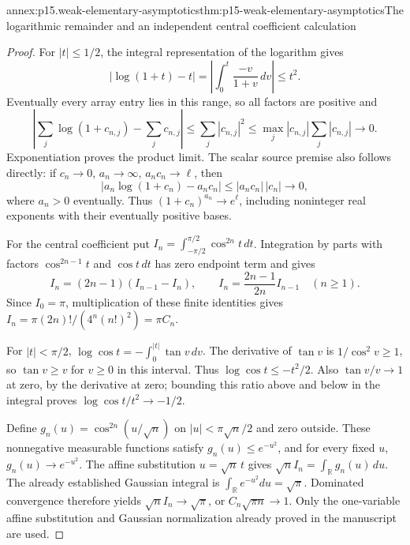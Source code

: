 \begin{annexitem}{annex:p15.weak-elementary-asymptotics}{thm:p15-weak-elementary-asymptotics}{The logarithmic remainder and an independent central coefficient calculation}
\begin{proof}
For \(|t|\leq1/2\), the integral representation of the
logarithm gives
\[
 |\log(1+t)-t|
 =\left|\int_0^t\frac{-v}{1+v}\,dv\right|
 \leq t^2.
\]
Eventually every array entry lies in this range, so all
factors are positive and
\[
 \left|\sum_j\log(1+c_{n,j})-\sum_jc_{n,j}\right|
 \leq\sum_j|c_{n,j}|^2
 \leq\max_j|c_{n,j}|\sum_j|c_{n,j}|\longrightarrow0.
\]
Exponentiation proves the product limit.
The scalar source premise also follows directly: if
\(c_n\to0\), \(a_n\to\infty\), \(a_nc_n\to\ell\), then
\[
 |a_n\log(1+c_n)-a_nc_n|\leq |a_nc_n|\,|c_n|\to0,
\]
where \(a_n>0\) eventually. Thus \((1+c_n)^{a_n}\to e^\ell\),
including noninteger real exponents with their eventually
positive bases.

For the central coefficient put
\(I_n=\int_{-\pi/2}^{\pi/2}\cos^{2n}t\,dt\).
Integration by parts with factors
\(\cos^{2n-1}t\) and \(\cos t\,dt\) has zero endpoint term
and gives
\[
 I_n=(2n-1)(I_{n-1}-I_n),\qquad
 I_n=\frac{2n-1}{2n}I_{n-1}\quad(n\geq1).
\]
Since \(I_0=\pi\), multiplication of these finite identities
gives \(I_n=\pi(2n)!/(4^n(n!)^2)=\pi C_n\).

For \(|t|<\pi/2\),
\(\log\cos t=-\int_0^{|t|}\tan v\,dv\).
The derivative of \(\tan v\) is \(1/\cos^2v\geq1\), so
\(\tan v\geq v\) for \(v\geq0\) in this interval.
Thus \(\log\cos t\leq-t^2/2\).
Also \(\tan v/v\to1\) at zero, by the derivative at zero;
bounding this ratio above and below in the integral proves
\(\log\cos t/t^2\to-1/2\).

Define \(g_n(u)=\cos^{2n}(u/\sqrt n)\) on
\(|u|<\pi\sqrt n/2\) and zero outside.
These nonnegative measurable functions satisfy
\(g_n(u)\leq e^{-u^2}\), and for every fixed \(u\),
\(g_n(u)\to e^{-u^2}\).
The affine substitution \(u=\sqrt n\,t\) gives
\(\sqrt n I_n=\int_{\mathbb R}g_n(u)\,du\).
The already established Gaussian integral is
\(\int_{\mathbb R}e^{-u^2}du=\sqrt\pi\).
Dominated convergence therefore yields
\(\sqrt n I_n\to\sqrt\pi\), or
\(C_n\sqrt{\pi n}\to1\).
Only the one-variable affine substitution and Gaussian
normalization already proved in the manuscript are used.
\end{proof}
\end{annexitem}

